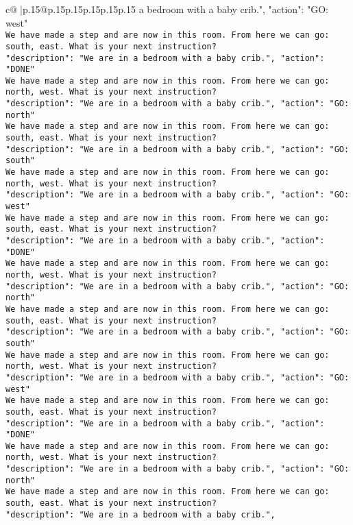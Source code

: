 \documentclass{article}
\begin{document}
{\begin{supertabular}{c@{$\;$}|p{.15\linewidth}@{}p{.15\linewidth}p{.15\linewidth}p{.15\linewidth}p{.15\linewidth}p{.15\linewidth}}
{{{a bedroom with a baby crib.", "action": "GO: west"}\\ \tt We have made a step and are now in this room. From here we can go: south, east. What is your next instruction?\\ \tt {"description": "We are in a bedroom with a baby crib.", "action": "DONE"}\\ \tt We have made a step and are now in this room. From here we can go: north, west. What is your next instruction?\\ \tt {"description": "We are in a bedroom with a baby crib.", "action": "GO: north"}\\ \tt We have made a step and are now in this room. From here we can go: south, east. What is your next instruction?\\ \tt {"description": "We are in a bedroom with a baby crib.", "action": "GO: south"}\\ \tt We have made a step and are now in this room. From here we can go: north, west. What is your next instruction?\\ \tt {"description": "We are in a bedroom with a baby crib.", "action": "GO: west"}\\ \tt We have made a step and are now in this room. From here we can go: south, east. What is your next instruction?\\ \tt {"description": "We are in a bedroom with a baby crib.", "action": "DONE"}\\ \tt We have made a step and are now in this room. From here we can go: north, west. What is your next instruction?\\ \tt {"description": "We are in a bedroom with a baby crib.", "action": "GO: north"}\\ \tt We have made a step and are now in this room. From here we can go: south, east. What is your next instruction?\\ \tt {"description": "We are in a bedroom with a baby crib.", "action": "GO: south"}\\ \tt We have made a step and are now in this room. From here we can go: north, west. What is your next instruction?\\ \tt {"description": "We are in a bedroom with a baby crib.", "action": "GO: west"}\\ \tt We have made a step and are now in this room. From here we can go: south, east. What is your next instruction?\\ \tt {"description": "We are in a bedroom with a baby crib.", "action": "DONE"}\\ \tt We have made a step and are now in this room. From here we can go: north, west. What is your next instruction?\\ \tt {"description": "We are in a bedroom with a baby crib.", "action": "GO: north"}\\ \tt We have made a step and are now in this room. From here we can go: south, east. What is your next instruction?\\ \tt {"description": "We are in a bedroom with a baby crib.", }}}
\end{supertabular}}
\end{document}
